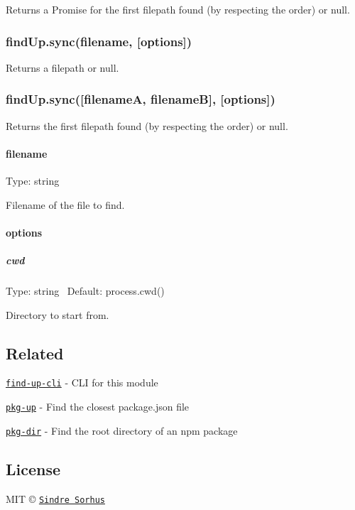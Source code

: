 Returns a {\ttfamily Promise} for the first filepath found (by respecting the order) or {\ttfamily null}.

\subsubsection*{find\+Up.\+sync(filename, \mbox{[}options\mbox{]})}

Returns a filepath or {\ttfamily null}.

\subsubsection*{find\+Up.\+sync(\mbox{[}filename\+A, filename\+B\mbox{]}, \mbox{[}options\mbox{]})}

Returns the first filepath found (by respecting the order) or {\ttfamily null}.

\paragraph*{filename}

Type\+: {\ttfamily string}

Filename of the file to find.

\paragraph*{options}

\subparagraph*{cwd}

Type\+: {\ttfamily string}~\newline
 Default\+: {\ttfamily process.\+cwd()}

Directory to start from.

\subsection*{Related}


\begin{DoxyItemize}
\item \href{https://github.com/sindresorhus/find-up-cli}{\tt find-\/up-\/cli} -\/ C\+LI for this module
\item \href{https://github.com/sindresorhus/pkg-up}{\tt pkg-\/up} -\/ Find the closest package.\+json file
\item \href{https://github.com/sindresorhus/pkg-dir}{\tt pkg-\/dir} -\/ Find the root directory of an npm package
\end{DoxyItemize}

\subsection*{License}

M\+IT © \href{https://sindresorhus.com}{\tt Sindre Sorhus} 